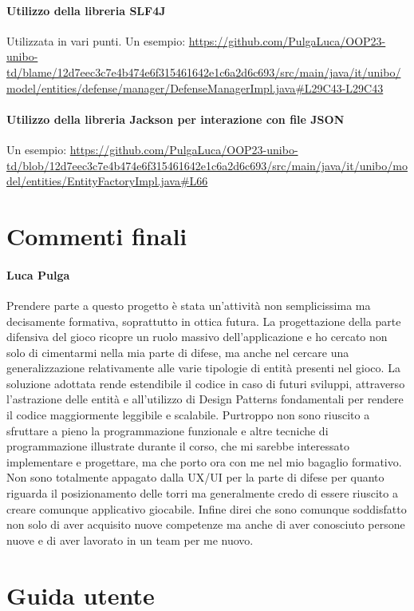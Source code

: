 \documentclass[a4paper,12pt]{report}
\begin{document}
\subsubsection{Utilizzo della libreria SLF4J}
Utilizzata in vari punti. Un esempio:  
\url{https://github.com/PulgaLuca/OOP23-unibo-td/blame/12d7eec3c7e4b474e6f315461642e1c6a2d6c693/src/main/java/it/unibo/model/entities/defense/manager/DefenseManagerImpl.java#L29C43-L29C43}

\subsubsection{Utilizzo della libreria Jackson per interazione con file JSON}
Un esempio:  
\url{https://github.com/PulgaLuca/OOP23-unibo-td/blob/12d7eec3c7e4b474e6f315461642e1c6a2d6c693/src/main/java/it/unibo/model/entities/EntityFactoryImpl.java#L66}


\chapter{Commenti finali}
\subsubsection{Luca Pulga}
Prendere parte a questo progetto è stata un'attività non semplicissima ma decisamente formativa, soprattutto in ottica futura.
La progettazione della parte difensiva del gioco ricopre un ruolo massivo dell'applicazione e ho cercato non solo di cimentarmi nella mia parte di difese, ma anche nel cercare una generalizzazione relativamente alle varie tipologie di entità presenti nel gioco. La soluzione adottata rende estendibile il codice in caso di futuri sviluppi, attraverso l'astrazione delle entità e all'utilizzo di Design Patterns fondamentali per rendere il codice maggiormente leggibile e scalabile. Purtroppo non sono riuscito a sfruttare a pieno la programmazione funzionale e altre tecniche di programmazione illustrate durante il corso, che mi sarebbe interessato implementare e progettare, ma che porto ora con me nel mio bagaglio formativo. Non sono totalmente appagato dalla UX/UI per la parte di difese per quanto riguarda il posizionamento delle torri ma generalmente credo di essere riuscito a creare comunque applicativo giocabile. Infine direi che sono comunque soddisfatto non solo di aver acquisito nuove competenze ma anche di aver conosciuto persone nuove e di aver lavorato in un team per me nuovo.


\appendix
\chapter{Guida utente}
\end{document}

